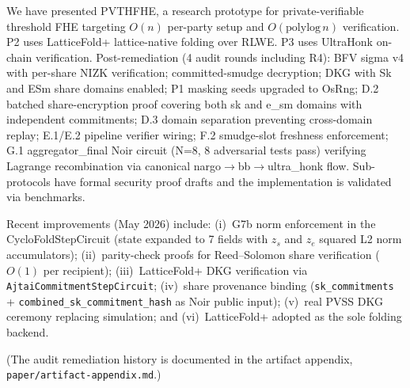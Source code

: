 \documentclass{llncs}
\begin{document}
We have presented PVTHFHE, a research prototype for private-verifiable threshold FHE targeting $O(n)$ per-party setup and $O(\text{polylog}\, n)$ verification. P2 uses LatticeFold+ lattice-native folding over RLWE. P3 uses UltraHonk on-chain verification. Post-remediation (4 audit rounds including R4): BFV sigma v4 with per-share NIZK verification; committed-smudge decryption; DKG with Sk and ESm share domains enabled; P1 masking seeds upgraded to OsRng; D.2 batched share-encryption proof covering both sk and e\_sm domains with independent commitments; D.3 domain separation preventing cross-domain replay; E.1/E.2 pipeline verifier wiring; F.2 smudge-slot freshness enforcement; G.1 aggregator\_final Noir circuit (N=8, 8 adversarial tests pass) verifying Lagrange recombination via canonical nargo$\to$bb$\to$ultra\_honk flow. Sub-protocols have formal security proof drafts and the implementation is validated via benchmarks.

Recent improvements (May 2026) include: (i)~G7b norm enforcement in the CycloFoldStepCircuit (state expanded to 7 fields with $z_s$ and $z_e$ squared L2 norm accumulators); (ii)~parity-check proofs for Reed--Solomon share verification ($O(1)$ per recipient); (iii)~LatticeFold+ DKG verification via \texttt{AjtaiCommitmentStepCircuit}; (iv)~share provenance binding (\texttt{sk\_commitments} + \texttt{combined\_sk\_commitment\_hash} as Noir public input); (v)~real PVSS DKG ceremony replacing simulation; and (vi)~LatticeFold+ adopted as the sole folding backend.

(The audit remediation history is documented in the artifact appendix,
\texttt{paper/artifact-appendix.md}.)



\end{document}
